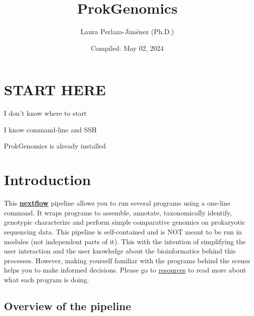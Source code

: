\documentclass[
]{book}
\title{ProkGenomics}
\author{Laura Perlaza-Jiménez (Ph.D.)}
\date{Compiled: May 02, 2024}
\begin{document}
\maketitle

{
\setcounter{tocdepth}{1}
\tableofcontents
}
\hypertarget{start-here}{%
\chapter{START HERE}\label{start-here}}

{I don't know where to start}

{I know command-line and SSH}

{ProkGenomics is already installed }

\hypertarget{introduction}{%
\chapter{Introduction}\label{introduction}}

This \textbf{\href{https://www.nextflow.io/}{nextflow}} pipeline allows you to run several programs using a one-line command. It wraps programs to assemble, annotate, taxonomically identify, genotypic characterize and perform simple comparative genomics on prokaryotic sequencing data. This pipeline is self-contained and is NOT meant to be run in modules (not independent parts of it). This with the intention of simplifying the user interaction and the user knowledge about the bioinformatics behind this processes. However, making yourself familiar with the programs behind the scenes helps you to make informed decisions. Please go to \href{resources.html}{resources} to read more about what each program is doing.

\hypertarget{overview-of-the-pipeline}{%
\section{Overview of the pipeline}\label{overview-of-the-pipeline}}
\end{document}
